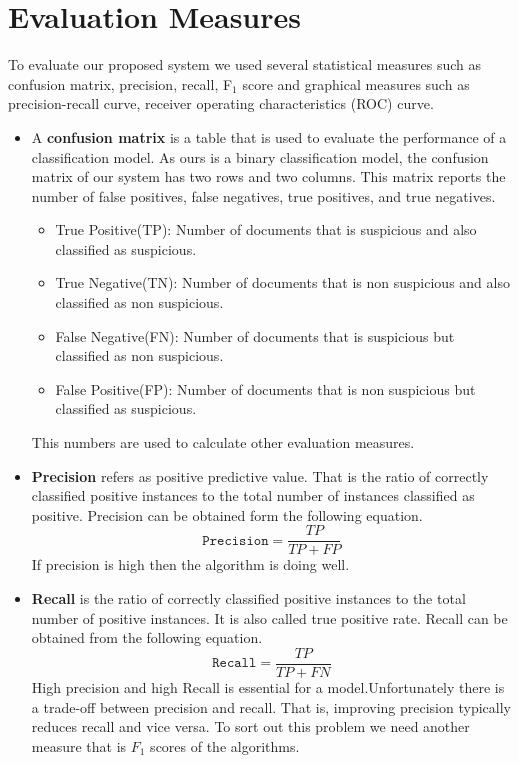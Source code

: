 \section{\textbf{Evaluation Measures}}
To evaluate our proposed system we used several statistical measures such as confusion matrix, precision, recall, F$_1$ score and graphical measures such as precision-recall curve, receiver operating characteristics (ROC) curve.

\begin{itemize}
\item {A \textbf{confusion matrix}} is a table that is used to evaluate the performance of a classification model. As ours is a binary classification model, the confusion matrix of our system has two rows and two columns. This matrix reports the number of false positives, false negatives, true positives, and true negatives.

\begin{itemize}
    \item True Positive(TP): Number of documents that is suspicious and also classified as suspicious.\vspace{0.2cm}
    \item True Negative(TN): Number of documents that is non suspicious and also classified as non suspicious.\vspace{0.2cm}
    \item False Negative(FN): Number of documents that is suspicious but classified as non suspicious.\vspace{0.2cm}
    \item False Positive(FP): Number of documents that is non suspicious but classified as suspicious. 
\end{itemize}

This numbers are used to calculate other evaluation measures.
\vspace{0.3cm}
\item{\textbf{Precision}} refers as positive predictive value. That is the ratio of correctly classified positive instances to the total number of instances classified as positive. Precision can be obtained form  the following equation.
\begin{equation}
    \texttt{Precision} = \frac{TP}{TP+FP}
\end{equation}
If precision is high then the algorithm is doing well.

\vspace{0.3cm}
\item{\textbf{Recall}} is the ratio of correctly classified positive instances to the total number of positive instances. It is also called true positive rate. Recall can be obtained from the following equation.
\begin{equation}
    \texttt{Recall} = \frac{TP}{TP+FN}
\end{equation}
High precision and high Recall is essential for a model.Unfortunately there is a trade-off between precision and recall. That is, improving precision typically reduces recall and vice versa. To sort out this problem we need another measure that is $F_1$ scores of the algorithms.


\end{itemize}
